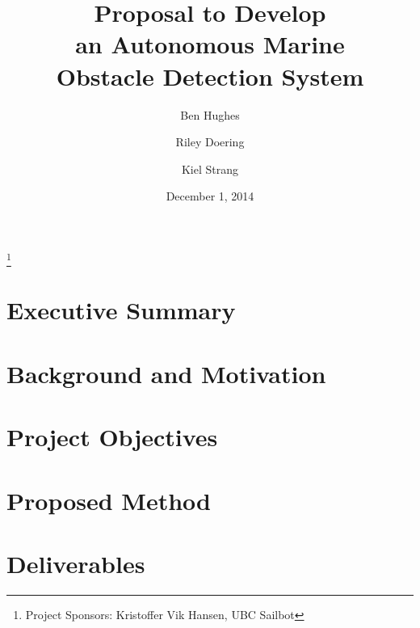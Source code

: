 \documentclass[amsmath, amssymb, aps, pra, 12pt]{revtex4-1}
\begin{document}
\title{Proposal to Develop\\an Autonomous Marine\\Obstacle Detection System}
\author{Ben Hughes}
\thanks{Project Sponsors: Kristoffer Vik Hansen, UBC Sailbot}
\author{Riley Doering}
\author{Kiel Strang}
\date{December 1, 2014}
\maketitle


\section*{Executive Summary}


\newpage
\tableofcontents

\makeatletter
\let\toc@pre\relax
\let\toc@post\relax
\makeatother 

\newpage
\listoffigures
\listoftables

\clearpage
\newpage
{}






\section{\label{sec:intro}Background and Motivation}


\section{\label{sec:objectives}Project Objectives}


\section{\label{sec:method}Proposed Method}


\section{\label{sec:deliverables}Deliverables}

\end{document}
